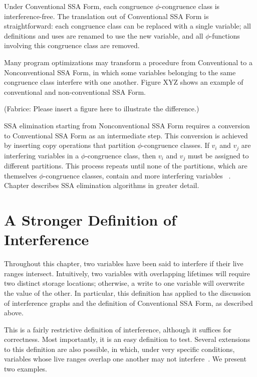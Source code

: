 Under Conventional SSA Form, each congruence $\phi$-congruence class
is interference-free.  The translation out of Conventional SSA Form
is straightforward: each congruence class can be replaced with a single
variable; all definitions and uses are renamed to use the new variable,
and all $\phi$-functions involving this congruence class are removed. 

Many program optimizations may transform a procedure from Conventional
to a Nonconventional SSA Form, in which some variables belonging to
the same congruence class interfere with one another. Figure XYZ
shows an example of conventional and non-conventional SSA Form. 

(Fabrice: Please insert a figure here to illustrate the difference.) 

SSA elimination
starting from Nonconventional SSA Form requires a conversion to 
Conventional SSA Form as an intermediate step. This conversion is
achieved by inserting copy operations that partition $\phi$-congruence
classes. If $v_{i}$ and $v_{j}$ are interfering variables in a $\phi$-congruence
class, then $v_{i}$ and $v_{j}$ must be assigned to different partitions. 
This process repeats until none of the partitions, which are themselves
$\phi$-congruence classes, contain and more interfering variables
~\cite{SreedharSep99, BoissinotApr09}. Chapter 
\label{chap:alternative_ssa_destruction_algorithm}
describes SSA elimination algorithms in greater detail.

\section{A Stronger Definition of Interference}

Throughout this chapter, two variables have been said to interfere
if their live ranges intersect. Intuitively, two variables with overlapping
lifetimes will require two distinct storage locations; otherwise, a write
to one variable will overwrite the value of the other. In particular,
this definition has applied to the discussion of interference graphs
and the definition of Conventional SSA Form, as described above.

This is a fairly restrictive definition of interference, although it suffices
for correctness. Most importantly, it is an easy definition to test. 
Several extensions to this definition are also possible, in which,
under very specific conditions, variables whose live ranges overlap
one another may not interfere~\cite{Chaitin81, ChaitinJun82}. 
We present two examples.

